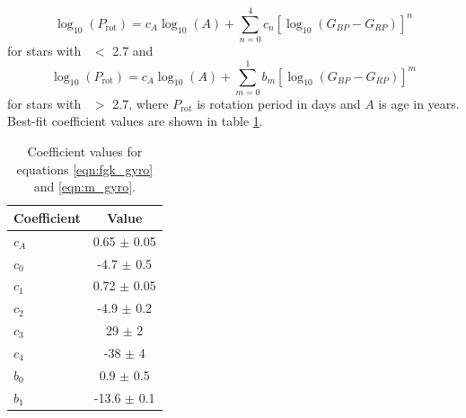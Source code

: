 \begin{equation}
    \log_{10}(P_\mathrm{rot}) =
    c_A\log_{10}(A) +
    \sum_{n=0}^4 c_n[\log_{10}(G_{BP}-G_{RP})]^n
\label{eqn:fgk_gyro}
\end{equation}
for stars with \gcolor\ $<$ 2.7 and
\begin{equation}
    \log_{10}(P_\mathrm{rot}) =
    c_A\log_{10}(A) +
    \sum_{m=0}^1 b_m[\log_{10}(G_{BP}-G_{RP})]^m
\label{eqn:m_gyro}
\end{equation}
for stars with \gcolor\ $>$ 2.7, where $P_{\mathrm{rot}}$ is rotation period
in days and $A$ is age in years.
Best-fit coefficient values are shown in table \ref{tab:coefficients}.
\begin{table}[h!]
  \begin{center}
      \caption{Coefficient values for equations \ref{eqn:fgk_gyro} and
      \ref{eqn:m_gyro}.}
    \label{tab:coefficients}
    \begin{tabular}{l|c} %
      Coefficient & Value  \\
      \hline
      $c_A$ & 0.65 $\pm$ 0.05 \\
      $c_0$ & -4.7 $\pm$ 0.5 \\
      $c_1$ & 0.72 $\pm$ 0.05 \\
      $c_2$ & -4.9 $\pm$ 0.2 \\
      $c_3$ & 29 $\pm$ 2 \\
      $c_4$ & -38 $\pm$ 4 \\
      $b_0$ & 0.9 $\pm$ 0.5 \\
      $b_1$ & -13.6 $\pm$ 0.1 \\
    \end{tabular}
  \end{center}
\end{table}

